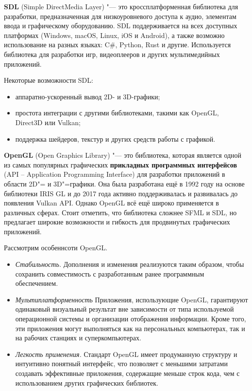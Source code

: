 \textbf{SDL} (Simple DirectMedia Layer) "--- это кроссплатформенная библиотека для разработки, предназначенная для низкоуровневого доступа к аудио, элементам ввода и графическому оборудованию. SDL поддерживается на всех доступных платформах (Windows, macOS, Linux, iOS и Android), а также возможно использование на разных языках: C\#, Python, Rust и другие. Используется библиотека для разработки игр, видеоплееров и других мультимедийных приложений. \cite{sdl_doc}

Некоторые возможности SDL:
\begin{itemize}
    \item аппаратно-ускоренный вывод 2D- и 3D-графики;
    \item простота интеграции с другими библиотеками, такими как OpenGL, \\ Direct3D или Vulkan;
    \item поддержка шейдеров, текстур и других средств работы с графикой. 
\end{itemize}

\textbf{OpenGL} (Open Graphics Library) "--- это библиотека, которая является одной из самых популярных графических \textbf{прикладных программных интерфейсов} (API – Application Programming Interface) для разработки приложений в области 2D"= и 3D"=графики. Она была разработана ещё в 1992 году на основе библиотеки IRIS GL и до 2017 года активно поддерживалась и развивалась до появления Vulkan API. Однако OpenGL всё ещё широко применяется в различных сферах. Стоит отметить, что библиотека сложнее SFML и SDL, но предлагает широкие возможности и гибкость для продвинутых графических приложений. \cite{opengl_doc}

Рассмотрим особеннсоти OpenGL.
\begin{itemize}
    \item \textit{Стабильность.} Дополнения и изменения реализуются таким образом, чтобы сохранить совместимость с разработанным ранее программным обеспечением.
    \item \textit{Мультиплатформенность} Приложения, использующие OpenGL, гарантируют одинаковый визуальный результат вне зависимости от типа используемой операционной системы и организации отображения информации. Кроме того, эти приложения могут выполняться как на персональных компьютерах, так и на рабочих станциях и суперкомпьютерах.
    \item \textit{Легкость применения.} Стандарт OpenGL имеет продуманную структуру и интуитивно понятный интерфейс, что позволяет с меньшими затратами создавать эффективные приложения, содержащие меньше строк кода, чем с использованием других графических библиотек.
\end{itemize}